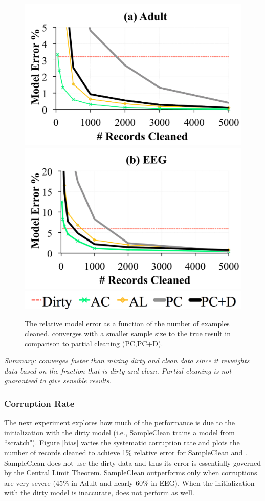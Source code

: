\begin{figure}[ht!]
\centering\vspace{-0.5em}
 \includegraphics[width=0.49\columnwidth]{exp/exp14a.pdf}
    \includegraphics[width=0.49\columnwidth]{exp/exp14b.pdf}
    \includegraphics[width=0.49\columnwidth]{exp/legend-14.png}\vspace{-0.5em}
 \caption{The relative model error as a function of the number of examples cleaned. \sys converges with a smaller sample size to the true result in comparison to partial cleaning (PC,PC+D).  \label{pc-perf}}
\end{figure}

\noindent \emph{Summary: \sys converges faster than mixing dirty and clean data since it reweights data based on the fraction that is dirty and clean. Partial cleaning is not guaranteed to give sensible results.}

\vspace{1em}

\subsubsection{Corruption Rate}
The next experiment explores how much of the performance
is due to the initialization with the dirty model (i.e., SampleClean trains a model from ``scratch").
Figure \ref{bias} varies the systematic corruption rate and plots the number of records cleaned to achieve 1\% relative error for SampleClean and \sys.
SampleClean does not use the dirty data and thus its error is essentially governed by the Central Limit Theorem.
SampleClean outperforms \sys only when corruptions are very severe (45\% in Adult and nearly 60\% in EEG).
When the initialization with the dirty model is inaccurate, \sys does not perform as well. 

